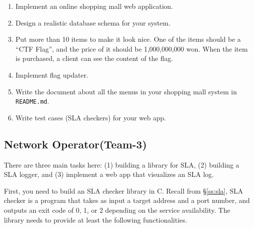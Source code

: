 \documentclass[a4paper, 11pt]{article}
\newcommand*{\Modthree}{Network Operator\xspace}%
\theoremstyle{definition}
\begin{document}
{\begin{enumerate}
  \item Implement an online shopping mall web application.

  \item Design a realistic database schema for your system.

  \item Put more than 10 items to make it look nice. One of the items
    should be a ``CTF Flag'', and the price of it should be
    1,000,000,000 won. When the item is purchased, a client can see
    the content of the flag.

  \item Implement flag updater.

  \item Write the document about all the menus in your shopping mall
    system in \texttt{README.md}.

  \item Write test cases (SLA checkers) for your web app.

\end{enumerate}

\subsection{\Modthree (Team-3)} \label{ss:modthree}

There are three main tasks here: (1) building a library for SLA, (2)
building a SLA logger, and (3) implement a web app that visualizes an
SLA log.

First, you need to build an SLA checker library in C. Recall from
\S\ref{ss:sla}, SLA checker is a program that takes as input a target
address and a port number, and outputs an exit code of 0, 1, or 2
depending on the service availability. The library needs to provide at
least the following functionalities.

}
\end{document}
